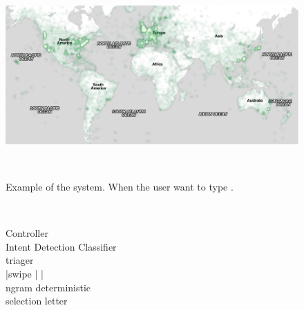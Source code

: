\begin{figure}
  \centering
  \includegraphics[width=1.75\columnwidth]{figures/map}
  \caption{Example of the system.  When the user want to type .}
  ~\label{fig:example}
\end{figure}



\begin{figure}
\centering


	\caption{
    Controller\\
	Intent Detection Classifier\\
    triager \\
	|swipe          |                |\\
    ngram           deterministic     \\
    selection        letter           \\
}~\label{fig:systemFlowchart}
\end{figure}


